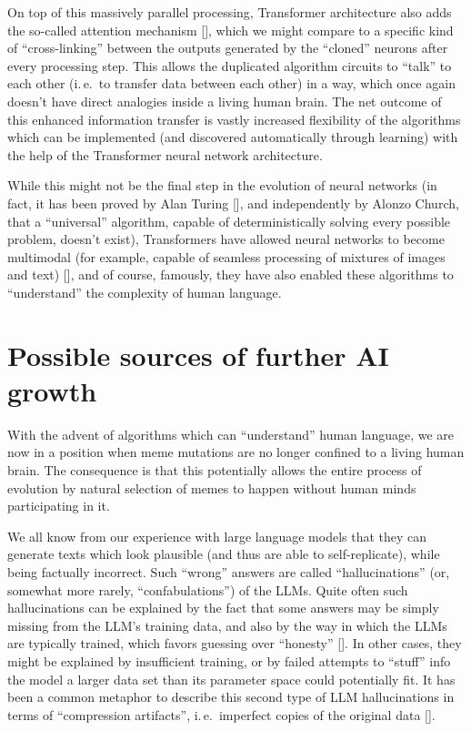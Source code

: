 \documentclass[12pt]{article}
\newcommand{\citestrut}[1]{\vphantom{[}{#1}\vphantom{]}}
\renewcommand{\cite}[1]{[\hyperlink{#1}{\citestrut{#1}}]}
\begin{document}
On top of this massively parallel processing, Transformer architecture also adds the
so-called attention mechanism \cite{Attention}, which we might compare to a specific kind
of ``cross-linking'' between the outputs generated by the ``cloned'' neurons after every
processing step. This allows the duplicated algorithm circuits to ``talk'' to each other
(i.\,e.\ to transfer data between each other) in a way, which once again doesn't have
direct analogies inside a living human brain. The net outcome of this enhanced
information transfer is vastly increased flexibility of the algorithms which can be
implemented (and discovered automatically through learning) with the help of the
Transformer neural network architecture.

While this might not be the final step in the evolution of neural networks (in fact, it
has been proved by Alan Turing \cite{Undecidability}, and independently by Alonzo Church,
that a ``universal'' algorithm, capable of deterministically solving every possible
problem, doesn't exist), Transformers have allowed neural networks to become multimodal
(for example, capable of seamless processing of mixtures of images and text)
\cite{Multimodality}, and of course, famously, they have also enabled these algorithms to
``understand'' the complexity of human language.

\section{Possible sources of further AI growth}

With the advent of algorithms which can ``understand'' human language, we are now in a
position when meme mutations are no longer confined to a living human brain. The
consequence is that this potentially allows the entire process of evolution by natural
selection of memes to happen without human minds participating in it.

We all know from our experience with large language models that they can generate texts
which look plausible (and thus are able to self-replicate), while being factually
incorrect. Such ``wrong'' answers are called ``hallucinations'' (or, somewhat more
rarely, ``confabulations'') of the LLMs. Quite often such hallucinations can be explained
by the fact that some answers may be simply missing from the LLM's training data, and
also by the way in which the LLMs are typically trained, which favors guessing over
``honesty'' \cite{Hallucinations}. In other cases, they might be explained by
insufficient training, or by failed attempts to ``stuff'' info the model a larger data
set than its parameter space could potentially fit. It has been a common metaphor to
describe this second type of LLM hallucinations in terms of ``compression artifacts'',
i.\,e.\ imperfect copies of the original data \cite{Compression}.
\end{document}
